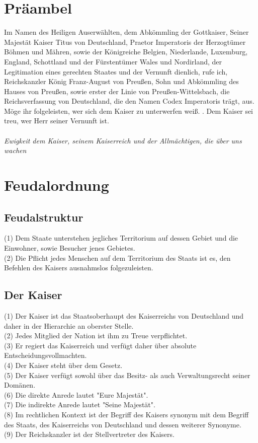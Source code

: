 \documentclass{article}
\begin{document}
\section{Präambel}
Im Namen des Heiligen Auserwählten, dem Abkömmling der Gottkaiser, Seiner Majestät Kaiser Titus von Deutschland, Praetor Imperatoris der Herzogtümer Böhmen und Mähren, sowie der Königreiche Belgien, Niederlande, Luxemburg, England, Schottland und der Fürstentümer Wales und Nordirland, der Legitimation eines gerechten Staates und der Vernunft dienlich, rufe ich, Reichskanzler König Franz-August von Preußen, Sohn und Abkömmling des Hauses von Preußen, sowie erster der Linie von Preußen-Wittelsbach, die Reichsverfassung von Deutschland, die den Namen Codex Imperatoris trägt, aus. Möge ihr folgeleisten, wer sich dem Kaiser zu unterwerfen weiß. .
Dem Kaiser sei treu, wer Herr seiner Vernunft ist.\\\\
\textit{Ewigkeit dem Kaiser, seinem Kaiserreich und der Allmächtigen, die über uns wachen}
\newpage
\section{Feudalordnung}
\subsection{Feudalstruktur}
(1) Dem Staate unterstehen jegliches Territorium auf dessen Gebiet und die Einwohner, sowie Besucher jenes Gebietes.\\
(2) Die Pflicht jedes Menschen auf dem Territorium des Staats ist es, den Befehlen des Kaisers ausnahmslos folgezuleisten.\\

\subsection{Der Kaiser}
(1) Der Kaiser ist das Staatsoberhaupt des Kaiserreichs von Deutschland und daher in der Hierarchie an oberster Stelle. \\ 
(2) Jedes Mitglied der Nation ist ihm zu Treue verpflichtet.\\
(3) Er regiert das Kaiserreich und verfügt daher über absolute Entscheidungsvollmachten.\\
(4) Der Kaiser steht über dem Gesetz.\\
(5) Der Kaiser verfügt sowohl über das Besitz- als auch Verwaltungsrecht seiner Domänen.\\
(6) Die direkte Anrede lautet "Eure Majestät".\\
(7) Die indirekte Anrede lautet "Seine Majestät".\\
(8) Im rechtlichen Kontext ist der Begriff des Kaisers synonym mit dem Begriff des Staats, des Kaiserreichs von Deutschland und dessen weiterer Synonyme.\\
(9) Der Reichskanzler ist der Stellvertreter des Kaisers.
\end{document}
